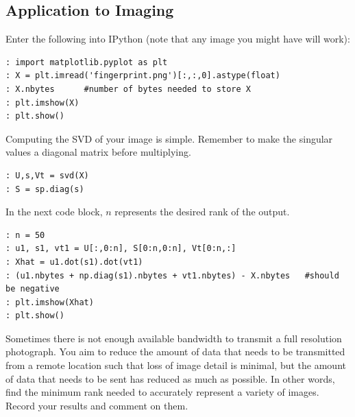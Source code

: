 \subsection*{Application to Imaging}
Enter the following into IPython (note that any image you might have will work):
\begin{lstlisting}
: import matplotlib.pyplot as plt
: X = plt.imread('fingerprint.png')[:,:,0].astype(float)
: X.nbytes      #number of bytes needed to store X
: plt.imshow(X)
: plt.show()
\end{lstlisting}
Computing the SVD of your image is simple.  Remember to make the singular values a diagonal matrix before multiplying.
\begin{lstlisting}
: U,s,Vt = svd(X)
: S = sp.diag(s)
\end{lstlisting}
In the next code block, $n$ represents the desired rank of the output.
\begin{lstlisting}
: n = 50
: u1, s1, vt1 = U[:,0:n], S[0:n,0:n], Vt[0:n,:]
: Xhat = u1.dot(s1).dot(vt1)
: (u1.nbytes + np.diag(s1).nbytes + vt1.nbytes) - X.nbytes   #should be negative
: plt.imshow(Xhat)
: plt.show()
\end{lstlisting}

\begin{problem}
Sometimes there is not enough available bandwidth to transmit a full resolution photograph.
You aim to reduce the amount of data that needs to be transmitted from a remote location such that loss of image detail is minimal, 
but the amount of data that needs to be sent has reduced as much as possible.  In other words, find the minimum rank needed to accurately represent a variety of images.
Record your results and comment on them.
\end{problem}
